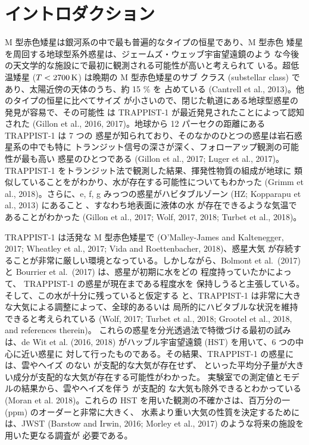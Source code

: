 \documentclass{dennou777}
\newcommand*\cec[1]{\cesplit{{\,\ }{\0}}{#1}}
\begin{document}
\section{イントロダクション\label{intro}}
M 型赤色矮星は銀河系の中で最も普遍的なタイプの恒星であり、M 型赤色
矮星を周回する地球型系外惑星は、ジェームズ・ウェッブ宇宙望遠鏡のよう
な今後の天文学的な施設にで最初に観測される可能性が高いと考えられて
いる。超低温矮星 (\(T<2700\hmu{K}\)) は晩期の M 型赤色矮星のサブ
クラス (substellar class) であり、太陽近傍の天体のうち、約 15 \% を
占めている (Cantrell et al., 2013)。他のタイプの恒星に比べてサイズ
が小さいので、閉じた軌道にある地球型惑星の発見が容易で、その可能性
は TRAPPIST-1 が最近発見されたことによって認知された (Gillon et al.,
2016, 2017)。地球から 12 パーセクの距離にある TRAPPIST-1 は 7 つの
惑星が知られており、そのなかのひとつの惑星は岩石惑星系の中でも特に
トランジット信号の深さが深く、フォローアップ観測の可能性が最も高い
惑星のひとつである (Gillon et al., 2017; Luger et al., 2017)。
TRAPPIST-1 をトランジット法で観測した結果、揮発性物質の組成が地球に
類似していることをがわかり、水が存在する可能性についてもわかった
(Grimm et al., 2018)。さらに、e, f, g みっつの惑星がハビタブルゾーン
(HZ; Kopparapu et al., 2013) にあること 、すなわち地表面に液体の水
が存在できるような気温であることがわかった (Gillon et al., 2017; Wolf,
2017, 2018; Turbet et al., 2018)。

TRAPPIST-1 は活発な M 型赤色矮星で (O'Malley-James and Kaltenegger,
2017; Wheatley et al., 2017; Vida and Roettenbacher, 2018)、惑星大気
が存続することが非常に厳しい環境となっている。しかしながら、Bolmont
et al.\ (2017) と Bourrier et al.\ (2017) は、惑星が初期に水をどの
程度持っていたかによって、 TRAPPIST-1 の惑星が現在まである程度水を
保持しうると主張している。そして、この水が十分に残っていると仮定する
と、TRAPPIST-1 は非常に大きな大気による調整によって、全球的あるいは
局所的にハビタブルな状況を維持できると考えられている (Wolf, 2017;
Turbet et al., 2018; Grootel et al., 2018, and references therein)。
これらの惑星を分光透過法で特徴づける最初の試みは、de Wit et al. (2016,
2018) がハッブル宇宙望遠鏡 (HST) を用いて、6 つの中心に近い惑星に
対して行ったものである。その結果、TRAPPIST-1 の惑星には、雲やヘイズ
のない  が支配的な大気が存在せず、\cec{N2, O2, H2O, CO2, CH4}
といった平均分子量が大きい成分が支配的な大気が存在する可能性がわかった。
実験室での測定値とモデルの結果から、雲やヘイズを伴う  が支配的
な大気も除外できるとわかっている (Moran et al. 2018)。これらの HST
を用いた観測の不確かさは、百万分の一 (ppm) のオーダーと非常に大きく、
水素より重い大気の性質を決定するためには、JWST (Barstow and Irwin,
2016; Morley et al., 2017) のような将来の施設を用いた更なる調査が
必要である。
\end{document}

